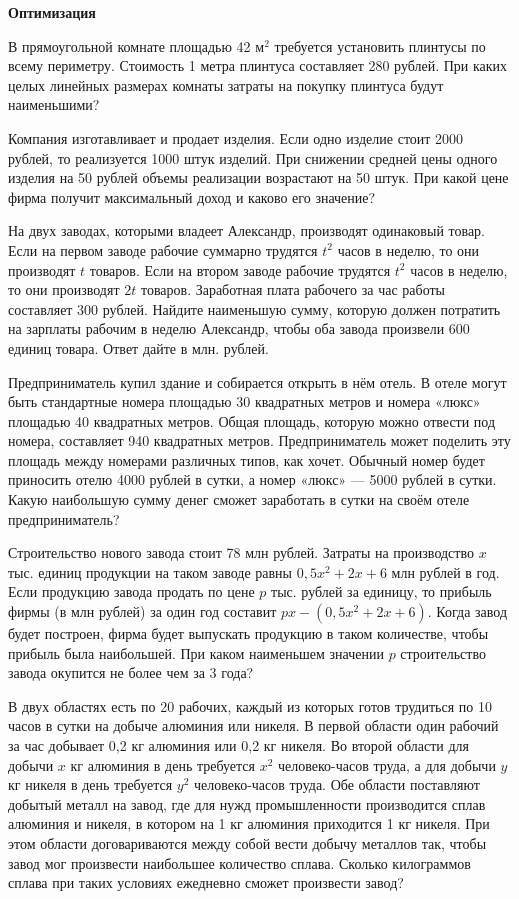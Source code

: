 \centerline{\bf \Huge Оптимизация}
\centerline{\bf \Huge }


 В прямоугольной комнате площадью 42 м$^2$ требуется установить плинтусы по всему периметру. Стоимость 1 метра плинтуса составляет 280 рублей. При каких целых линейных размерах
комнаты затраты на покупку плинтуса будут наименьшими?

 Компания изготавливает и продает изделия. Если одно изделие стоит 2000 рублей, то реализуется 1000 штук изделий. При снижении средней цены одного изделия на 50 рублей
объемы реализации возрастают на 50 штук. При какой цене фирма получит максимальный
доход и каково его значение?

 На двух заводах, которыми владеет Александр, производят одинаковый товар. Если на первом заводе рабочие суммарно трудятся $t^2$
 часов в неделю, то они производят $t$ товаров. Если
на втором заводе рабочие трудятся $t^2$
часов в неделю, то они производят $2t$ товаров. Заработная
плата рабочего за час работы составляет 300 рублей. Найдите наименьшую сумму, которую
должен потратить на зарплаты рабочим в неделю Александр, чтобы оба завода произвели 600
единиц товара. Ответ дайте в млн. рублей.

 Предприниматель купил здание и собирается открыть в нём отель. В отеле могут быть
стандартные номера площадью 30 квадратных метров и номера «люкс» площадью 40 квадратных метров. Общая площадь, которую можно отвести под номера, составляет 940 квадратных
метров. Предприниматель может поделить эту площадь между номерами различных типов,
как хочет. Обычный номер будет приносить отелю 4000 рублей в сутки, а номер «люкс» — 5000
рублей в сутки. Какую наибольшую сумму денег сможет заработать в сутки на своём отеле
предприниматель?


 Строительство нового завода стоит 78 млн рублей. Затраты на производство $x$ тыс. единиц продукции на таком заводе равны $0,5x^2+ 2x + 6$ млн рублей в год. Если продукцию завода
продать по цене $p$ тыс. рублей за единицу, то прибыль фирмы (в млн рублей) за один год
составит $px - (0,5x^2+ 2x + 6)$.
Когда завод будет построен, фирма будет выпускать продукцию в таком количестве, чтобы
прибыль была наибольшей.
При каком наименьшем значении $p$ строительство завода окупится не более чем за 3 года?

 В двух областях есть по 20 рабочих, каждый из которых готов трудиться по 10 часов в сутки на добыче алюминия или никеля. В первой области один рабочий за час добывает 0,2 кг
алюминия или 0,2 кг никеля. Во второй области для добычи $x$ кг алюминия в день требуется
$x^2$ человеко-часов труда, а для добычи $y$ кг никеля в день требуется $y^2$ человеко-часов труда.
Обе области поставляют добытый металл на завод, где для нужд промышленности производится сплав алюминия и никеля, в котором на 1 кг алюминия приходится 1 кг никеля. При этом
области договариваются между собой вести добычу металлов так, чтобы завод мог произвести
наибольшее количество сплава. Сколько килограммов сплава при таких условиях ежедневно
сможет произвести завод?

